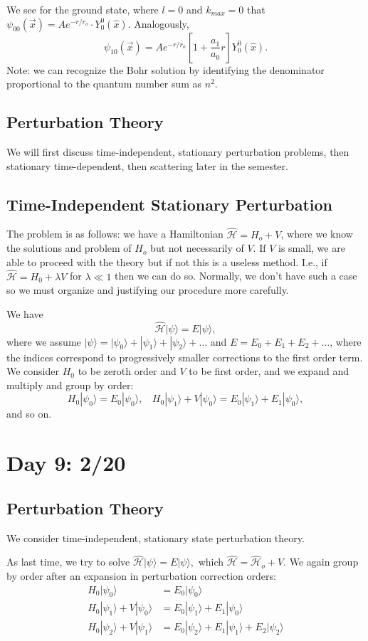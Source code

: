 \documentclass[fontsize=12pt]{scrartcl}
\newcommand{\ra}{\rangle}
\newcommand{\pos}{\hat{x}}
\newcommand{\Ham}{\hat{\mathcal{H}}}
\begin{document}
We see for the ground state, where $l=0$ and $k_{max}=0$ that $\psi_{00}(\vec{x})=Ae^{-r/r_o}\cdot Y_0^0(\pos).$ Analogously, $$\psi_{10}(\vec{x})=Ae^{-r/r_o}\left[1+\frac{a_1}{a_0}r\right]Y_0^0(\hat{x}).$$ Note: we can recognize the Bohr solution by identifying the denominator proportional to the quantum number sum as $n^2$.

\subsection{Perturbation Theory}

We will first discuss time-independent, stationary perturbation problems, then stationary time-dependent, then scattering later in the semester.

\subsection{Time-Independent Stationary Perturbation}

The problem is as follows: we have a Hamiltonian $\Ham=H_o+V$, where we know the solutions and problem of $H_o$ but not necessarily of $V$. If $V$ is small, we are able to proceed with the theory but if not this is a useless method. I.e., if $\Ham=H_0+\lambda V$ for $\lambda \ll 1$ then we can do so. Normally, we don't have such a case so we must organize and justifying our procedure more carefully.

We have $$\Ham|\psi\ra = E|\psi\ra,$$ where we assume $|\psi\ra = |\psi_0\ra +|\psi_1\ra +|\psi_2\ra +\dots$ and $E=E_0+E_1+E_2+\dots$, where the indices correspond to progressively smaller corrections to the first order term. We consider $H_0$ to be zeroth order and $V$ to be first order, and we expand and multiply and group by order: $$H_0|\psi_0\ra = E_0|\psi_0\ra,\ \ \ \ H_0|\psi_1\ra + V|\psi_0\ra = E_0|\psi_1\ra + E_1|\psi_0\ra,$$ and so on.


\section{Day 9: 2/20}


\subsection{Perturbation Theory}

We consider time-independent, stationary state perturbation theory.

As last time, we try to solve $\Ham|\psi\ra=E|\psi\ra,$ which $\Ham=\Ham_o+V$. We again group by order after an expansion in perturbation correction orders: \begin{align*}
H_0|\psi_0\ra &= E_0|\psi_0\ra\\
H_0|\psi_1\ra + V|\psi_0\ra &= E_0|\psi_1\ra +E_1|\psi_0\ra\\
H_0|\psi_2\ra + V|\psi_1\ra &= E_0|\psi_2\ra + E_1|\psi_1\ra +E_2|\psi_2\ra
\end{align*}
\end{document}
